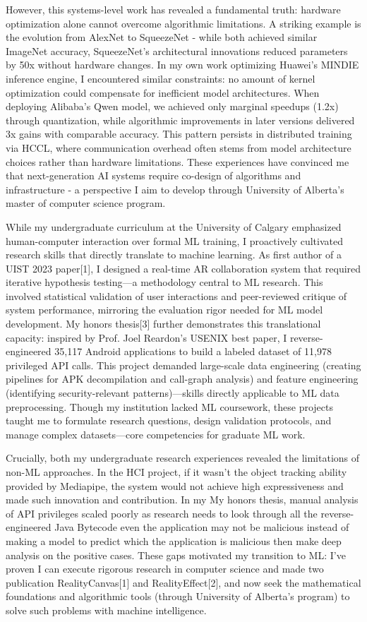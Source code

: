 \documentclass{article}
\begin{document}
However, this systems-level work has revealed a fundamental truth: hardware optimization alone cannot overcome algorithmic limitations. A striking example is the evolution from AlexNet to SqueezeNet - while both achieved similar ImageNet accuracy, SqueezeNet's architectural innovations reduced parameters by 50x without hardware changes. In my own work optimizing Huawei's MINDIE inference engine, I encountered similar constraints: no amount of kernel optimization could compensate for inefficient model architectures. When deploying Alibaba's Qwen model, we achieved only marginal speedups (1.2x) through quantization, while algorithmic improvements in later versions delivered 3x gains with comparable accuracy. This pattern persists in distributed training via HCCL, where communication overhead often stems from model architecture choices rather than hardware limitations. These experiences have convinced me that next-generation AI systems require co-design of algorithms and infrastructure - a perspective I aim to develop through University of Alberta's master of computer science program.

While my undergraduate curriculum at the University of Calgary emphasized human-computer interaction over formal ML training, I proactively cultivated research skills that directly translate to machine learning. As first author of a UIST 2023 paper[1], I designed a real-time AR collaboration system that required iterative hypothesis testing—a methodology central to ML research. This involved statistical validation of user interactions and peer-reviewed critique of system performance, mirroring the evaluation rigor needed for ML model development. My honors thesis[3] further demonstrates this translational capacity: inspired by Prof. Joel Reardon's USENIX best paper, I reverse-engineered 35,117 Android applications to build a labeled dataset of 11,978 privileged API calls. This project demanded large-scale data engineering (creating pipelines for APK decompilation and call-graph analysis) and feature engineering (identifying security-relevant patterns)—skills directly applicable to ML data preprocessing. Though my institution lacked ML coursework, these projects taught me to formulate research questions, design validation protocols, and manage complex datasets—core competencies for graduate ML work.

Crucially, both my undergraduate research experiences revealed the limitations of non-ML approaches. In the HCI project, if it wasn't the object tracking ability provided by Mediapipe, the system would not achieve high expressiveness 
and made such innovation and contribution. 
In my My honors thesis, manual analysis of API privileges scaled poorly as 
research needs to look through all the reverse-engineered Java Bytecode even the application 
may not be malicious instead of making a model to predict which the application is malicious then 
make deep analysis on the positive cases. These gaps motivated my transition to ML: I've proven I can execute rigorous research in computer science and made two publication RealityCanvas[1] and RealityEffect[2], and now seek the mathematical foundations and algorithmic tools (through University of Alberta's program) to solve such problems with machine intelligence.
\end{document}
